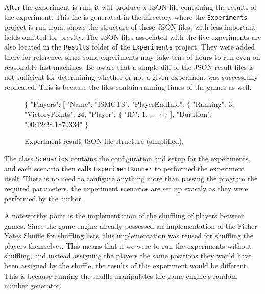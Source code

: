 After the experiment is run, it will produce a JSON file containing the results
of the experiment. This file is generated in the directory where the \texttt{Experiments}
project is run from.
 shows the structure of these JSON files, with less
important fields omitted for brevity. The JSON files associated with the five
experiments are also located in the \texttt{Results} folder of the \texttt{Experiments}
project. They were added there for reference, since
some experiments may take tens of hours to run even on reasonably fast
machines. Be aware that a simple diff of the JSON result files
is not sufficient for determining whether or not a given experiment was successfully
replicated. This is because the files contain running times of the games as well.

\begin{figure}[ht]
\begin{code}[commandchars=\\\{\},codes={\catcode`\$=3\catcode`\^=7\catcode`\_=8}]
$\{$
    "Players": [
        "Name": "ISMCTS",
        "PlayerEndInfo": $\{$
            "Ranking": 3,
            "VictoryPoints": 24,
            "Player": $\{$
                "ID": 1,
                ...
            $\}$
        $\}$
    ],
    "Duration": "00:12:28.1879334"
$\}$
\end{code}
\caption{Experiment result JSON file structure (simplified).}\label{dd:experimentjson}
\end{figure}

The class \texttt{Scenarios} contains the configuration and setup for the experiments,
and each scenario then calls \texttt{ExperimentRunner} to performed
the experiment itself. There is no need to configure anything more than
passing the program the required parameters, the experiment scenarios
are set up exactly as they were performed by the author.

A noteworthy point is the implementation of the shuffling of players between games.
Since the game engine already possessed an implementation of the Fisher-Yates Shuffle
\cite{Knuth98} for shuffling lists, this implementation was reused for shuffling the
players themselves. This means that if we were to run the experiments
without shuffling, and instead assigning the players the same positions they would
have been assigned by the shuffle, the results of this experiment would be different.
This is because running the shuffle manipulates the game engine's random number generator.
